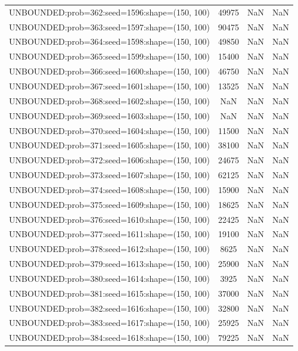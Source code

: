 \begin{longtable}{lccc}
UNBOUNDED:prob=362:seed=1596:shape=(150, 100) & 49975 &   NaN &    NaN \\
UNBOUNDED:prob=363:seed=1597:shape=(150, 100) & 90475 &   NaN &    NaN \\
UNBOUNDED:prob=364:seed=1598:shape=(150, 100) & 49850 &   NaN &    NaN \\
UNBOUNDED:prob=365:seed=1599:shape=(150, 100) & 15400 &   NaN &    NaN \\
UNBOUNDED:prob=366:seed=1600:shape=(150, 100) & 46750 &   NaN &    NaN \\
UNBOUNDED:prob=367:seed=1601:shape=(150, 100) & 13525 &   NaN &    NaN \\
UNBOUNDED:prob=368:seed=1602:shape=(150, 100) &   NaN &   NaN &    NaN \\
UNBOUNDED:prob=369:seed=1603:shape=(150, 100) &   NaN &   NaN &    NaN \\
UNBOUNDED:prob=370:seed=1604:shape=(150, 100) & 11500 &   NaN &    NaN \\
UNBOUNDED:prob=371:seed=1605:shape=(150, 100) & 38100 &   NaN &    NaN \\
UNBOUNDED:prob=372:seed=1606:shape=(150, 100) & 24675 &   NaN &    NaN \\
UNBOUNDED:prob=373:seed=1607:shape=(150, 100) & 62125 &   NaN &    NaN \\
UNBOUNDED:prob=374:seed=1608:shape=(150, 100) & 15900 &   NaN &    NaN \\
UNBOUNDED:prob=375:seed=1609:shape=(150, 100) & 18625 &   NaN &    NaN \\
UNBOUNDED:prob=376:seed=1610:shape=(150, 100) & 22425 &   NaN &    NaN \\
UNBOUNDED:prob=377:seed=1611:shape=(150, 100) & 19100 &   NaN &    NaN \\
UNBOUNDED:prob=378:seed=1612:shape=(150, 100) &  8625 &   NaN &    NaN \\
UNBOUNDED:prob=379:seed=1613:shape=(150, 100) & 25900 &   NaN &    NaN \\
UNBOUNDED:prob=380:seed=1614:shape=(150, 100) &  3925 &   NaN &    NaN \\
UNBOUNDED:prob=381:seed=1615:shape=(150, 100) & 37000 &   NaN &    NaN \\
UNBOUNDED:prob=382:seed=1616:shape=(150, 100) & 32800 &   NaN &    NaN \\
UNBOUNDED:prob=383:seed=1617:shape=(150, 100) & 25925 &   NaN &    NaN \\
UNBOUNDED:prob=384:seed=1618:shape=(150, 100) & 79225 &   NaN &    NaN \\

\end{longtable}
